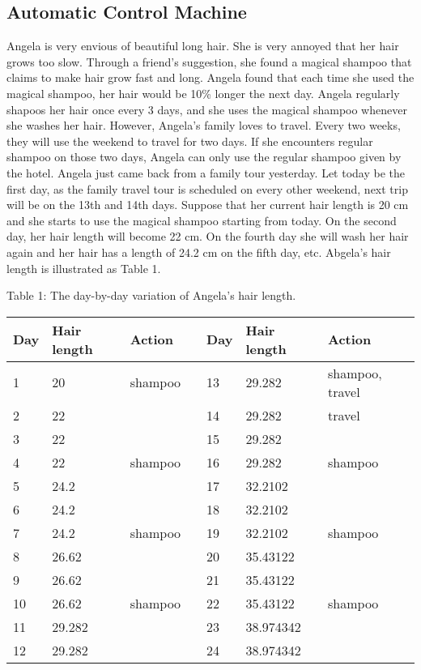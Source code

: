 \subsection{Automatic Control Machine}
Angela is very envious of beautiful long hair. She is very annoyed that her hair grows too slow. Through a friend's suggestion, she found a magical shampoo that claims to make hair grow fast and long. Angela found that each time she used the magical shampoo, her hair would be 10\% longer the next day. Angela regularly shapoos her hair once every 3 days, and she uses the magical shampoo whenever she washes her hair. However, Angela's family loves to travel. Every two weeks, they will use the weekend to travel for two days. If she encounters regular shampoo on those two days, Angela can only use the regular shampoo given by the hotel. Angela just came back from a family tour yesterday. Let today be the first day, as the family travel tour is scheduled on every other weekend, next trip will be on the 13th and 14th days. Suppose that her current hair length is 20 cm and she starts to use the magical shampoo starting from today. On the second day, her hair length will become 22 cm. On the fourth day she will wash her hair again and her hair has a length of 24.2 cm on the fifth day, etc. Abgela's hair length is illustrated as Table 1.

\begin{center}
Table 1: The day-by-day variation of Angela's hair length.
\begin{tabular}[c]{| l | l | l | l | l | l | l |}
\hline
Day & Hair length & Action & & Day & Hair length & Action\\
\hline
1 & 20 & shampoo & & 13 & 29.282 & shampoo, travel\\
\hline
2 & 22 & & & 14 & 29.282 & travel\\
\hline
3 & 22 & & & 15 & 29.282 &\\
\hline
4 & 22 & shampoo  & & 16 & 29.282 & shampoo\\
\hline
5 & 24.2 & & & 17 & 32.2102 &\\
\hline
6 & 24.2 & & & 18 & 32.2102 &\\
\hline
7 & 24.2 & shampoo & & 19 & 32.2102 & shampoo\\
\hline
8 & 26.62 & & & 20 & 35.43122 &\\
\hline
9 & 26.62 & & & 21 & 35.43122 &\\
\hline
10 & 26.62 & shampoo & & 22 & 35.43122 & shampoo\\
\hline
11 & 29.282 & & & 23 & 38.974342 &\\
\hline
12 & 29.282 & & & 24 & 38.974342 &\\
\hline
\end{tabular}
\end{center}

